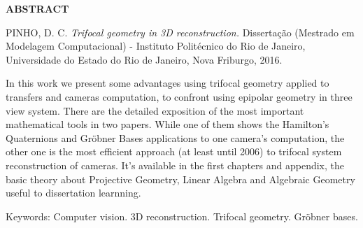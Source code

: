 \begin{center}
{\bf ABSTRACT}
\end{center}

\vspace{1 cm}

\begin{center}
\begin{minipage}{1\textwidth}
\noindent PINHO, D. C. {\it Trifocal geometry in 3D reconstruction.} Dissertação (Mestrado em Modelagem Computacional) - Instituto Politécnico do Rio de Janeiro, Universidade do Estado do Rio de Janeiro, Nova Friburgo, 2016.
\end{minipage}
\end{center}

\vspace{1 cm}

\begin{center}
\begin{minipage}{1\textwidth}
\qquad In this work we present some advantages using trifocal geometry applied to transfers and cameras computation, to confront using epipolar geometry in three view system. There are the detailed exposition of the most important mathematical tools in two papers. While one of them shows the Hamilton's Quaternions and Gr\"obner Bases applications to one camera's computation, the other one is the most efficient approach (at least until 2006) to trifocal system reconstruction of cameras. It's available in the first chapters and appendix, the basic theory about Projective Geometry, Linear Algebra and Algebraic Geometry useful to dissertation learnning.
\end{minipage}
\end{center}
 
\vspace{1 cm}

\begin{flushleft}
Keywords: Computer vision. 3D reconstruction. Trifocal geometry. Gr\"obner bases. 
\end{flushleft}

\newpage